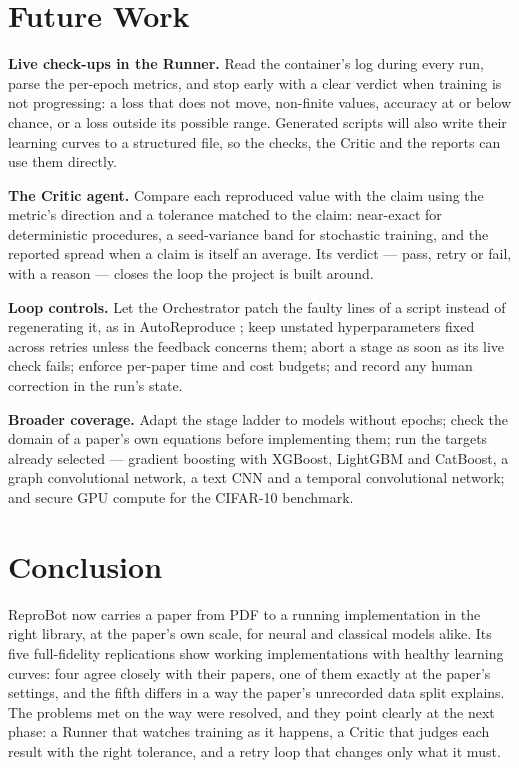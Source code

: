 \documentclass[11pt]{article}
\begin{document}
\section{Future Work}
\label{sec:future}

\textbf{Live check-ups in the Runner.} Read the container's log during every run, parse the
per-epoch metrics, and stop early with a clear verdict when training is not progressing: a loss
that does not move, non-finite values, accuracy at or below chance, or a loss outside its
possible range. Generated scripts will also write their learning curves to a structured file, so
the checks, the Critic and the reports can use them directly.

\textbf{The Critic agent.} Compare each reproduced value with the claim using the metric's
direction and a tolerance matched to the claim: near-exact for deterministic procedures, a
seed-variance band for stochastic training, and the reported spread when a claim is itself an
average. Its verdict --- pass, retry or fail, with a reason --- closes the loop the project is
built around.

\textbf{Loop controls.} Let the Orchestrator patch the faulty lines of a script instead of
regenerating it, as in AutoReproduce \cite{zhao2025autoreproduce}; keep unstated
hyperparameters fixed across retries unless the feedback concerns them; abort a stage as soon as
its live check fails; enforce per-paper time and cost budgets; and record any human correction
in the run's state.

\textbf{Broader coverage.} Adapt the stage ladder to models without epochs; check the domain of
a paper's own equations before implementing them; run the targets already selected --- gradient
boosting with XGBoost, LightGBM and CatBoost, a graph convolutional network, a text CNN and a
temporal convolutional network; and secure GPU compute for the CIFAR-10 benchmark.

\section{Conclusion}
\label{sec:conclusion}

ReproBot now carries a paper from PDF to a running implementation in the right library, at the
paper's own scale, for neural and classical models alike. Its five full-fidelity replications show working implementations with healthy learning curves: four agree closely with their papers, one of them exactly at the paper's settings, and the fifth differs in a way the paper's unrecorded data split explains. The problems met on
the way were resolved, and they point clearly at the next phase: a Runner that watches training
as it happens, a Critic that judges each result with the right tolerance, and a retry loop that
changes only what it must.
\end{document}
